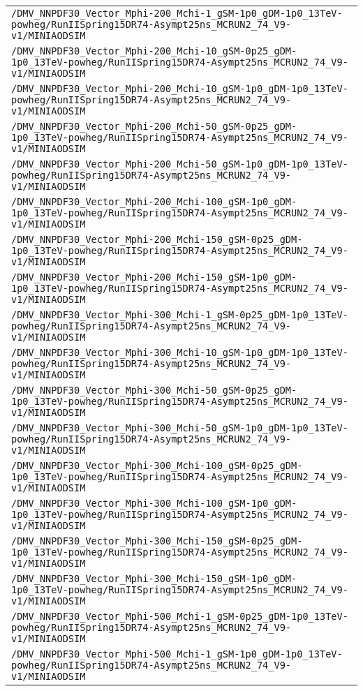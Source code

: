 \begin{center}
\begin{tabular}{l}
\verb!/DMV_NNPDF30_Vector_Mphi-200_Mchi-1_gSM-1p0_gDM-1p0_13TeV-powheg/RunIISpring15DR74-Asympt25ns_MCRUN2_74_V9-v1/MINIAODSIM! \tabularnewline
\verb!/DMV_NNPDF30_Vector_Mphi-200_Mchi-10_gSM-0p25_gDM-1p0_13TeV-powheg/RunIISpring15DR74-Asympt25ns_MCRUN2_74_V9-v1/MINIAODSIM! \tabularnewline
\verb!/DMV_NNPDF30_Vector_Mphi-200_Mchi-10_gSM-1p0_gDM-1p0_13TeV-powheg/RunIISpring15DR74-Asympt25ns_MCRUN2_74_V9-v1/MINIAODSIM! \tabularnewline
\verb!/DMV_NNPDF30_Vector_Mphi-200_Mchi-50_gSM-0p25_gDM-1p0_13TeV-powheg/RunIISpring15DR74-Asympt25ns_MCRUN2_74_V9-v1/MINIAODSIM! \tabularnewline
\verb!/DMV_NNPDF30_Vector_Mphi-200_Mchi-50_gSM-1p0_gDM-1p0_13TeV-powheg/RunIISpring15DR74-Asympt25ns_MCRUN2_74_V9-v1/MINIAODSIM! \tabularnewline
\verb!/DMV_NNPDF30_Vector_Mphi-200_Mchi-100_gSM-1p0_gDM-1p0_13TeV-powheg/RunIISpring15DR74-Asympt25ns_MCRUN2_74_V9-v1/MINIAODSIM! \tabularnewline
\verb!/DMV_NNPDF30_Vector_Mphi-200_Mchi-150_gSM-0p25_gDM-1p0_13TeV-powheg/RunIISpring15DR74-Asympt25ns_MCRUN2_74_V9-v1/MINIAODSIM! \tabularnewline
\verb!/DMV_NNPDF30_Vector_Mphi-200_Mchi-150_gSM-1p0_gDM-1p0_13TeV-powheg/RunIISpring15DR74-Asympt25ns_MCRUN2_74_V9-v1/MINIAODSIM! \tabularnewline
\verb!/DMV_NNPDF30_Vector_Mphi-300_Mchi-1_gSM-0p25_gDM-1p0_13TeV-powheg/RunIISpring15DR74-Asympt25ns_MCRUN2_74_V9-v1/MINIAODSIM! \tabularnewline
\verb!/DMV_NNPDF30_Vector_Mphi-300_Mchi-10_gSM-1p0_gDM-1p0_13TeV-powheg/RunIISpring15DR74-Asympt25ns_MCRUN2_74_V9-v1/MINIAODSIM! \tabularnewline
\verb!/DMV_NNPDF30_Vector_Mphi-300_Mchi-50_gSM-0p25_gDM-1p0_13TeV-powheg/RunIISpring15DR74-Asympt25ns_MCRUN2_74_V9-v1/MINIAODSIM! \tabularnewline
\verb!/DMV_NNPDF30_Vector_Mphi-300_Mchi-50_gSM-1p0_gDM-1p0_13TeV-powheg/RunIISpring15DR74-Asympt25ns_MCRUN2_74_V9-v1/MINIAODSIM! \tabularnewline
\verb!/DMV_NNPDF30_Vector_Mphi-300_Mchi-100_gSM-0p25_gDM-1p0_13TeV-powheg/RunIISpring15DR74-Asympt25ns_MCRUN2_74_V9-v1/MINIAODSIM! \tabularnewline
\verb!/DMV_NNPDF30_Vector_Mphi-300_Mchi-100_gSM-1p0_gDM-1p0_13TeV-powheg/RunIISpring15DR74-Asympt25ns_MCRUN2_74_V9-v1/MINIAODSIM! \tabularnewline
\verb!/DMV_NNPDF30_Vector_Mphi-300_Mchi-150_gSM-0p25_gDM-1p0_13TeV-powheg/RunIISpring15DR74-Asympt25ns_MCRUN2_74_V9-v1/MINIAODSIM! \tabularnewline
\verb!/DMV_NNPDF30_Vector_Mphi-300_Mchi-150_gSM-1p0_gDM-1p0_13TeV-powheg/RunIISpring15DR74-Asympt25ns_MCRUN2_74_V9-v1/MINIAODSIM! \tabularnewline
\verb!/DMV_NNPDF30_Vector_Mphi-500_Mchi-1_gSM-0p25_gDM-1p0_13TeV-powheg/RunIISpring15DR74-Asympt25ns_MCRUN2_74_V9-v1/MINIAODSIM! \tabularnewline
\verb!/DMV_NNPDF30_Vector_Mphi-500_Mchi-1_gSM-1p0_gDM-1p0_13TeV-powheg/RunIISpring15DR74-Asympt25ns_MCRUN2_74_V9-v1/MINIAODSIM! \tabularnewline

\end{tabular}
\end{center}
